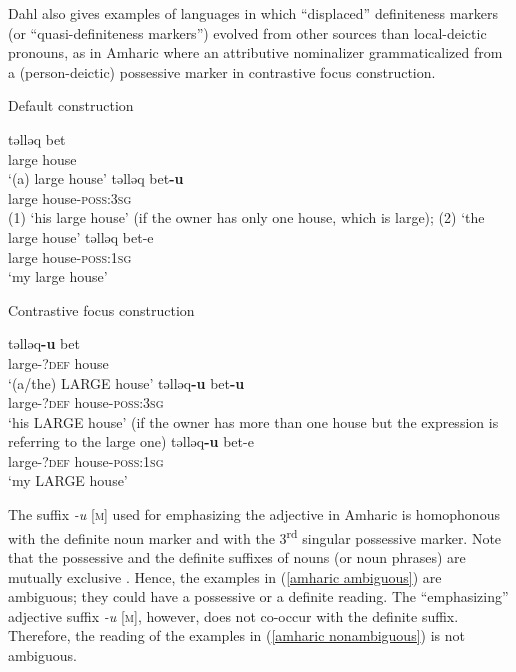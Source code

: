 {
Dahl also gives examples of languages in which “displaced” definiteness markers (or “quasi-definiteness markers”) evolved from other sources than local\hyp{}deictic pronouns, as in Amharic where an attributive nominalizer grammaticalized from a (person-deictic) possessive marker in contrastive focus construction.
\begin{exe}
\ex	{}
\begin{xlist}
\ex	\rm{Default construction}
\begin{xlist}
\ex
\gll	təlləq bet\\
	large	house\\								
\glt	‘(a) large house’
\ex	\label{amharic ambiguous}
\gll	təlləq bet\textbf{-u}\\
	large house-\textsc{poss:3sg}\\
\glt	(1) ‘his large house’ (if the owner has only one house, which is large); (2) ‘the large house’
\ex
\gll	təlləq bet-e\\
	large house-\textsc{poss:1sg}\\
\glt	‘my large house’
\end{xlist}
\ex	\rm{Contrastive focus construction}
\begin{xlist}
\ex	
\gll	təlləq\textbf{-u} bet\\
	large-\textsc{?def} house\\
\glt	‘(a/the) LARGE house’
\ex	\label{amharic nonambiguous}
\gll	təlləq\textbf{-u} bet\textbf{-u}\\
	large-\textsc{?def} house-\textsc{poss:3sg}\\
\glt	‘his LARGE house’ (if the owner has more than one house but the expression is referring to the large one)
\ex
\gll	təlləq\textbf{-u} bet-e\\
	large-\textsc{?def} house-\textsc{poss:1sg}\\
\glt	‘my LARGE house’
\end{xlist}
\end{xlist}
\end{exe}
The suffix \textit{-u} [\textsc{m}] used for emphasizing the adjective in Amharic is homophonous with the definite noun marker and with the 3\textsuperscript{rd} singular possessive marker. Note that the possessive and the definite suffixes of nouns (or noun phrases) are mutually exclusive \citep[463]{hudson1997}. Hence, the examples in (\ref{amharic ambiguous}) are ambiguous; they could have a possessive or a definite reading. The “emphasizing” adjective suffix \textit{-u} [\textsc{m}], however, does not co-occur with the definite suffix. Therefore, the reading of the examples in (\ref{amharic nonambiguous}) is not ambiguous.

}
